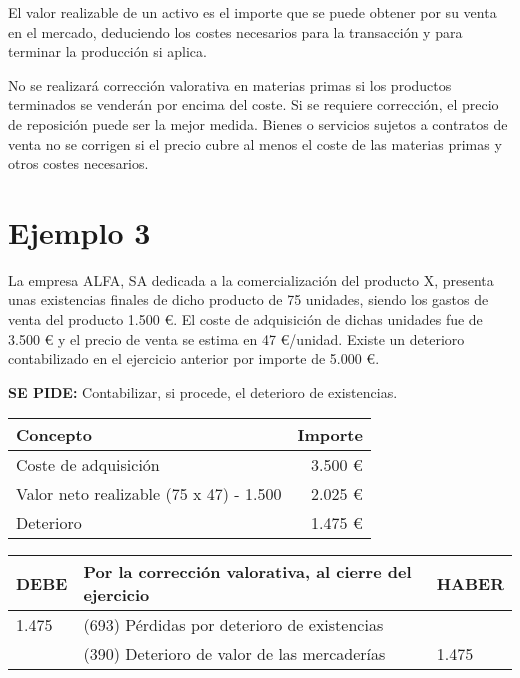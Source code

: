 \documentclass{article}
\begin{document}
El valor realizable de un activo es el importe que se puede obtener por su venta en el mercado, deduciendo los costes necesarios para la transacción y para terminar la producción si aplica.

No se realizará corrección valorativa en materias primas si los productos terminados se venderán por encima del coste. Si se requiere corrección, el precio de reposición puede ser la mejor medida. Bienes o servicios sujetos a contratos de venta no se corrigen si el precio cubre al menos el coste de las materias primas y otros costes necesarios.

\section*{Ejemplo 3}

La empresa ALFA, SA dedicada a la comercialización del producto X, presenta unas existencias finales de dicho producto de 75 unidades, siendo los gastos de venta del producto 1.500 €. El coste de adquisición de dichas unidades fue de 3.500 € y el precio de venta se estima en 47 €/unidad. Existe un deterioro contabilizado en el ejercicio anterior por importe de 5.000 €.

\textbf{SE PIDE:} Contabilizar, si procede, el deterioro de existencias.

\begin{table}[H]
    \centering
    \begin{tabular}{|l|r|}
        \hline
        \textbf{Concepto} & \textbf{Importe} \\
        \hline
        Coste de adquisición & 3.500 € \\
        \hline
        Valor neto realizable (75 x 47) - 1.500 & 2.025 € \\
        \hline
        Deterioro & 1.475 € \\
        \hline
    \end{tabular}
\end{table}

\begin{table}[H]
    \centering
    \begin{tabular}{|p{4cm}|p{4cm}|p{4cm}|}
        \hline
        \textbf{DEBE} & \textbf{Por la corrección valorativa, al cierre del ejercicio} & \textbf{HABER} \\
        \hline
        1.475 & (693) Pérdidas por deterioro de existencias &  \\
         & (390) Deterioro de valor de las mercaderías & 1.475 \\
        \hline
    \end{tabular}
\end{table}
\end{document}
